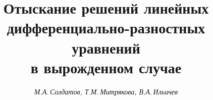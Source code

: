 











\newcommand{\Imm}{\operatorname{Im}}


\newcommand{\const}{\operatorname{const}}


\newcommand{\Ree}{\operatorname{Re}}


\newcommand{\Cc}{\bold C}


\newcommand{\dd}{\mathrm d}


\newcommand{\tts}[1]{}







\setcounter{page}{63}















\author{\it М.А.\,Солдатов, Т.М.\,Митрякова, В.А.\,Ильичев}




\title{Отыскание решений линейных дифференциально-разностных уравнений\\


в вырожденном случае}





\date{}




\pagestyle{plain} %





